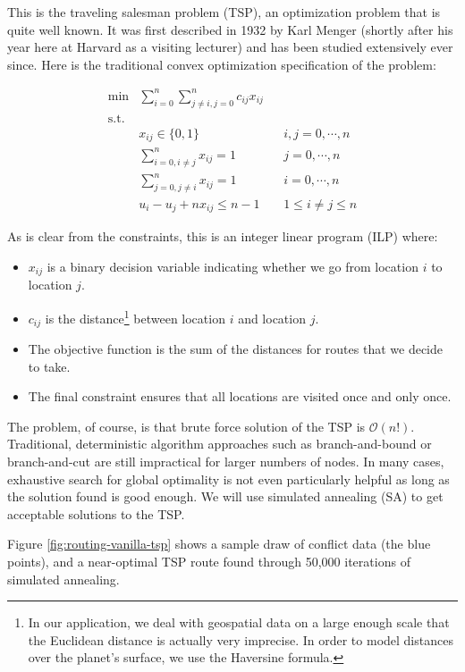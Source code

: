 \documentclass{article} %
\begin{document}
This is the traveling salesman problem (TSP), an optimization problem that is quite well known. It was first described in 1932 by Karl Menger (shortly after his year here at Harvard as a visiting lecturer) and has been studied extensively ever since.\cite{Menger} Here is the traditional convex optimization specification of the problem:\cite{Winston}


\begin{align*}
\min &\sum_{i=0}^n \sum_{j\ne i,j=0}^nc_{ij}x_{ij} &&  \\
\mathrm{s.t.} & \\
	& x_{ij} \in \{0, 1\} && i,j=0, \cdots, n \\
	& \sum_{i=0,i\ne j}^n x_{ij} = 1 && j=0, \cdots, n \\
	& \sum_{j=0,j\ne i}^n x_{ij} = 1 && i=0, \cdots, n \\
	&u_i-u_j +nx_{ij} \le n-1 && 1 \le i \ne j \le n
\end{align*}

As is clear from the constraints, this is an integer linear program (ILP) where:

\begin{itemize}
  \item $x_{ij}$ is a binary decision variable indicating whether we go from location $i$ to location $j$.
  \item $c_{ij}$ is the distance\footnote{In our application, we deal with geospatial data on a large enough scale that the Euclidean distance is actually very imprecise. In order to model distances over the planet's surface, we use the Haversine formula.} between location $i$ and location $j$.
  \item The objective function is the sum of the distances for routes that we decide to take.
  \item The final constraint ensures that all locations are visited once and only once.
\end{itemize}

The problem, of course, is that brute force solution of the TSP is $\mathcal{O}$$(n!)$. Traditional, deterministic
algorithm approaches such as branch-and-bound or branch-and-cut are still impractical for larger numbers of nodes.
In many cases, exhaustive search for global optimality is not even particularly helpful as long as the solution
found is good enough. We will use simulated annealing (SA) to get acceptable solutions to the TSP.

Figure \ref{fig:routing-vanilla-tsp} shows a sample draw of conflict data (the blue points), and a near-optimal TSP route found through 50,000 iterations of simulated annealing.
\end{document}
